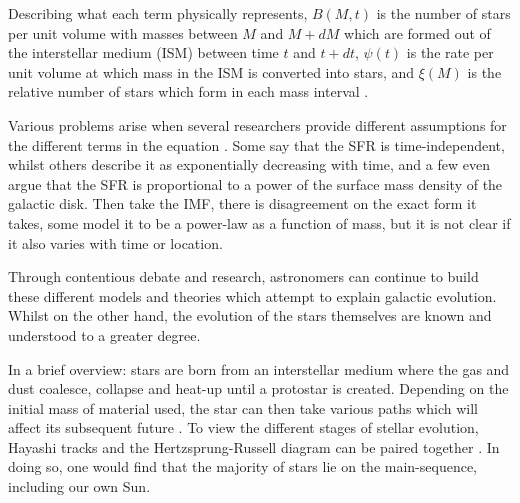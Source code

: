 \documentclass[12pt, twocolumn]{revtex4}    %
\begin{document}
Describing what each term physically represents, $B(M,t)$ is the number of stars per unit volume with masses between $M$ and $M+dM$ which are formed out of the interstellar medium (ISM) between time $t$ and $t+dt$, $\psi(t)$ is the rate per unit volume at which mass in the ISM is converted into stars, and $\xi(M)$ is the relative number of stars which form in each mass interval \cite{carroll_astro}. 

Various problems arise when several researchers provide different assumptions for the different terms in the equation \cite{carroll_astro}. Some say that the SFR is time-independent, whilst others describe it as exponentially decreasing with time, and a few even argue that the SFR is proportional to a power of the surface mass density of the galactic disk. Then take the IMF, there is disagreement on the exact form it takes, some model it to be a power-law as a function of mass, but it is not clear if it also varies with time or location.

Through contentious debate and research, astronomers can continue to build these different models and theories which attempt to explain galactic evolution. Whilst on the other hand, the evolution of the stars themselves are known and understood to a greater degree. 

In a brief overview: stars are born from an interstellar medium where the gas and dust coalesce, collapse and heat-up until a protostar is created. Depending on the initial mass of material used, the star can then take various paths which will affect its subsequent future \cite{mccoy_space_sciences}. To view the different stages of stellar evolution, Hayashi tracks and the Hertzsprung-Russell diagram can be paired together \cite{carroll_astro}. In doing so, one would find that the majority of stars lie on the main-sequence, including our own Sun. 
\end{document}
